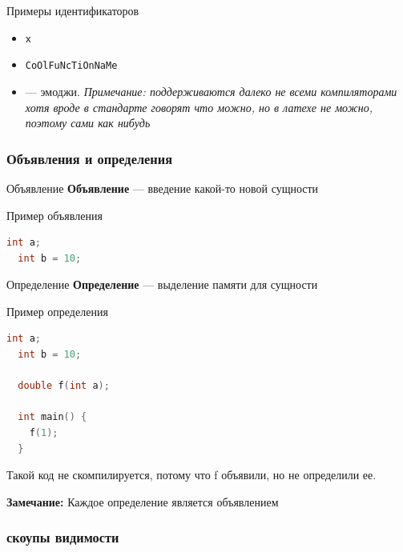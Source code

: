 \begin{definition}{Примеры идентификаторов}{}
\begin{itemize}
  \item \texttt{x}
  \item \texttt{CoOlFuNcTiOnNaMe}
  \item \texttt{} --- эмоджи. \textit{Примечание: поддерживаются далеко не всеми компиляторами хотя вроде в стандарте говорят что можно, но в латехе не можно, поэтому сами как нибудь}
\end{itemize}
\end{definition}
\subsubsection{Объявления и определения}
\begin{definition}{Объявление}{}
\textbf{Объявление} ---  введение какой-то новой сущности
\end{definition}
\begin{implementation}
{Пример объявления}{}
\begin{lstlisting}[language=C++]
  int a;
  int b = 10;
\end{lstlisting}
\end{implementation}
\begin{definition}
{Определение}{}
\textbf{Определение} --- выделение памяти для сущности
\end{definition}
\begin{implementation}
{Пример определения}{}
\begin{lstlisting}[language=C++]
  int a;
  int b = 10;

  double f(int a);

  int main() {
    f(1);
  }
\end{lstlisting}
Такой код не скомпилируется, потому что f объявили, но не определили ее.
\end{implementation}
\textbf{Замечание:} Каждое определение является объявлением
\subsubsection{скоупы видимости}

